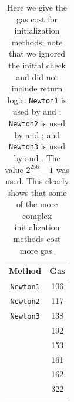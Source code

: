 \begin{table}[p]
\centering
\begin{tabular}{|c|S[table-format=3.0]|}
\hline
Method & Gas \\
\hline
\texttt{Newton1} & 106 \\
\texttt{Newton2} & 117 \\
\texttt{Newton3} & 138 \\
\BitLength{}     & 192 \\
\Linear{}        & 153 \\
\HyperFour{}     & 161 \\
\LookupFour{}    & 162 \\
\LookupEight{}   & 322 \\
\hline
\end{tabular}
\caption[Initialization Gas Costs]{Here we give
    the gas cost for initialization methods;
    note that we ignored the initial check and did not include
    return logic.
    \texttt{Newton1} is used by \UnrolledOne{} and \WhileOne{};
    \texttt{Newton2} is used by \UnrolledTwo{} and \WhileTwo{};
    and \texttt{Newton3} is used by \UnrolledThree{} and \WhileThree{}.
    The value $2^{256}-1$ was used.
    This clearly shows that some of the more complex initialization methods
    cost more gas.
    }
\label{table:initialzation_gas_costs}
\end{table}

